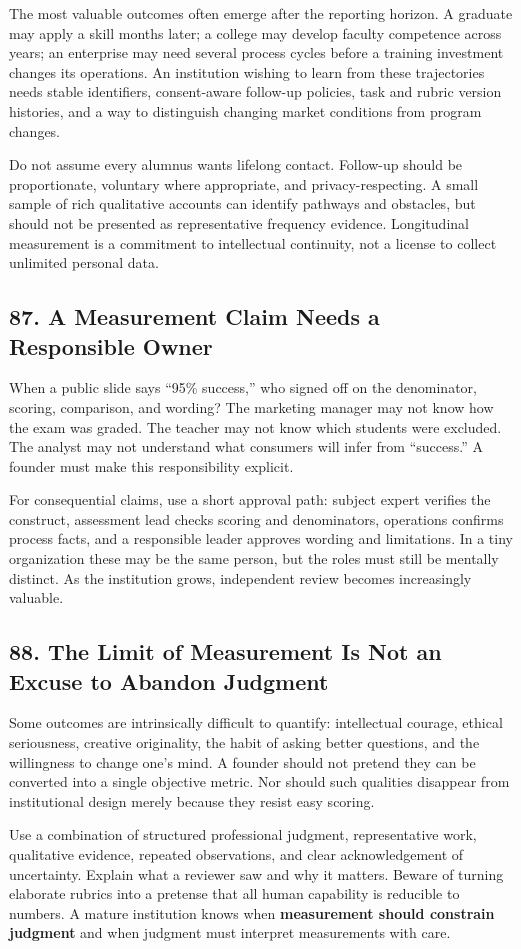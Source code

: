 The most valuable outcomes often emerge after the reporting horizon. A graduate may apply a skill months later; a college may develop faculty competence across years; an enterprise may need several process cycles before a training investment changes its operations. An institution wishing to learn from these trajectories needs stable identifiers, consent-aware follow-up policies, task and rubric version histories, and a way to distinguish changing market conditions from program changes.

Do not assume every alumnus wants lifelong contact. Follow-up should be proportionate, voluntary where appropriate, and privacy-respecting. A small sample of rich qualitative accounts can identify pathways and obstacles, but should not be presented as representative frequency evidence. Longitudinal measurement is a commitment to intellectual continuity, not a license to collect unlimited personal data.

\subsection*{87. A Measurement Claim Needs a Responsible Owner}

When a public slide says ``95\% success,'' who signed off on the denominator, scoring, comparison, and wording? The marketing manager may not know how the exam was graded. The teacher may not know which students were excluded. The analyst may not understand what consumers will infer from ``success.'' A founder must make this responsibility explicit.

For consequential claims, use a short approval path: subject expert verifies the construct, assessment lead checks scoring and denominators, operations confirms process facts, and a responsible leader approves wording and limitations. In a tiny organization these may be the same person, but the roles must still be mentally distinct. As the institution grows, independent review becomes increasingly valuable.

\subsection*{88. The Limit of Measurement Is Not an Excuse to Abandon Judgment}

Some outcomes are intrinsically difficult to quantify: intellectual courage, ethical seriousness, creative originality, the habit of asking better questions, and the willingness to change one's mind. A founder should not pretend they can be converted into a single objective metric. Nor should such qualities disappear from institutional design merely because they resist easy scoring.

Use a combination of structured professional judgment, representative work, qualitative evidence, repeated observations, and clear acknowledgement of uncertainty. Explain what a reviewer saw and why it matters. Beware of turning elaborate rubrics into a pretense that all human capability is reducible to numbers. A mature institution knows when \textbf{measurement should constrain judgment} and when judgment must interpret measurements with care.
